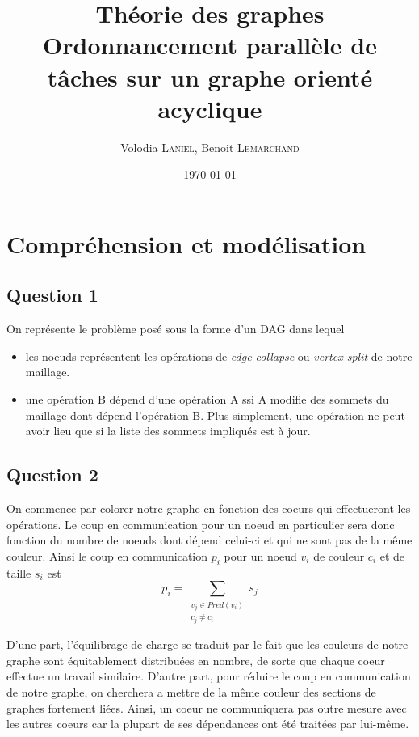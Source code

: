 \documentclass[11pt]{article}
\title{Théorie des graphes\\
Ordonnancement parallèle de tâches sur un graphe orienté acyclique}
\author{Volodia \textsc{Laniel}, Benoit \textsc{Lemarchand}}
\date{\today}
\begin{document}
\begin{titlepage}
  \maketitle
  \vfill
  \tableofcontents
\end{titlepage}

\section{Compréhension et modélisation}
  \subsection{Question 1}
    On représente le problème posé sous la forme d'un DAG dans lequel
    \begin{itemize}
      \item les noeuds représentent les opérations de \emph{edge collapse} ou
        \emph{vertex split} de notre maillage.
      \item une opération B dépend d'une opération A ssi A modifie des sommets
        du maillage dont dépend l'opération B. Plus simplement, une opération ne
        peut avoir lieu que si la liste des sommets impliqués est à jour.
    \end{itemize}

  \subsection{Question 2}
    On commence par colorer notre graphe en fonction des coeurs qui effectueront
    les opérations. Le coup en communication pour un noeud en particulier sera
    donc fonction du nombre de noeuds dont dépend celui-ci et qui ne sont pas
    de la même couleur. Ainsi le coup en communication $p_i$ pour un noeud $v_i$
    de couleur $c_i$ et de taille $s_i$ est
    \[ p_i = \sum_{\substack{v_j \in Pred(v_i) \\ c_j \neq c_i}}{s_j} \]

    D'une part, l'équilibrage de charge se traduit par le fait que les couleurs
    de notre graphe sont équitablement distribuées en nombre, de sorte que
    chaque coeur effectue un travail similaire. D'autre part, pour réduire le
    coup en communication de notre graphe, on cherchera a mettre de la même
    couleur des sections de graphes fortement liées. Ainsi, un coeur ne
    communiquera pas outre mesure avec les autres coeurs car la plupart de ses
    dépendances ont été traitées par lui-même.
\end{document}
